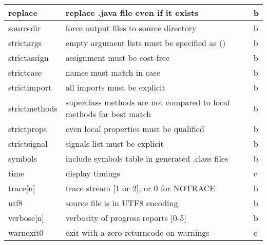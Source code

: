 \begin{longtable}[l]{|l|p{10cm}|l|}
\hline
 replace      & replace .java file even if it exists &b \\
\hline
 sourcedir    & force output files to source directory &b \\
\hline
 strictargs   & empty argument lists must be specified as () &b \\
\hline
 strictassign & assignment must be cost-free &b \\
\hline
 strictcase   & names must match in case &b \\
\hline
 strictimport & all imports must be explicit &b \\
\hline
 strictmethods & superclass methods are not compared to local methods for best match &b \\
\hline
 strictprops  & even local properties must be qualified &b \\
\hline
 strictsignal & signals list must be explicit &b \\
\hline
 symbols      & include symbols table in generated .class files &b \\
\hline
 time         & display timings &c \\
\hline
 trace[n]     & trace stream [1 or 2], or 0 for NOTRACE &b \\
\hline
 utf8         & source file is in UTF8 encoding &b \\
\hline
 verbose[n]   & verbosity of progress reports [0-5] &b \\
\hline
 warnexit0    & exit with a zero returncode on warnings &c \\
\hline
\end{longtable}

